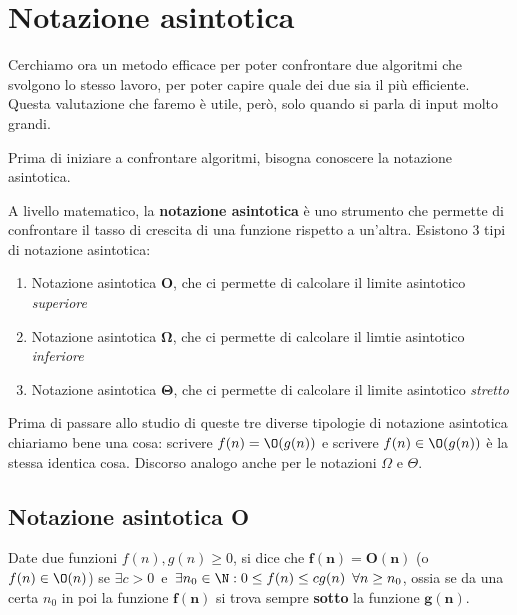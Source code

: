 \documentclass[11pt, a4paper, titlepage, oneside]{scrbook}
\begin{document}
\section{Notazione asintotica}

Cerchiamo ora un metodo efficace per poter confrontare due algoritmi che svolgono lo stesso lavoro, per poter capire quale dei due sia il più efficiente. Questa valutazione che faremo è utile, però, solo quando si parla di input molto grandi. 

Prima di iniziare a confrontare algoritmi, bisogna conoscere la notazione asintotica.

\begin{Definizione}
\label{def-not-ast}
A livello matematico, la \textbf{notazione asintotica} è uno strumento che permette di confrontare il tasso di crescita di una funzione rispetto a un'altra. Esistono 3 tipi di notazione asintotica:
\begin{enumerate}
    \item Notazione asintotica \textbf{O}, che ci permette di calcolare il limite asintotico \textit{superiore}
    \item Notazione asintotica $\bm{\Omega}$, che ci permette di calcolare il limtie asintotico \textit{inferiore}
    \item Notazione asintotica $\bm{\Theta}$, che ci permette di calcolare il limite asintotico \textit{stretto}
\end{enumerate}
\end{Definizione}

\NB Prima di passare allo studio di queste tre diverse tipologie di notazione asintotica chiariamo bene una cosa: scrivere $f(n) = \O(g(n))$ e scrivere $f(n) \in \O(g(n))$ è la stessa identica cosa. Discorso analogo anche per le notazioni $\Omega$ e $\Theta$.

\subsection{Notazione asintotica O}

\begin{Definizione}
\label{def-notazione-asintotica-O}
Date due funzioni $f(n), g(n) \geq 0$, si dice che $\bm{f(n) = \textbf{O}(n)}$ (o $f(n) \in \O(n)$) se \mbox{$\exists c > 0$ e $\exists n_0 \in \N: 0 \leq f(n) \leq c g(n) \enspace \forall n \geq n_0$}, ossia se da una certa $n_0$ in poi la funzione $\bm{f(n)}$ si trova sempre \textbf{sotto} la funzione $\bm{g(n)}$.
\end{Definizione}
\end{document}

